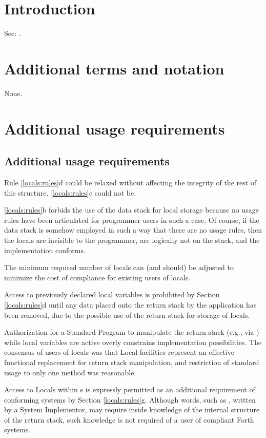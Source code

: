 \section{Introduction} %

See: .

\section{Additional terms and notation} %

None.

\section{Additional usage requirements} %

\begin{intro}
\subsection{Additional usage requirements} %

Rule \ref{locals:rules}d could be relaxed without affecting the
integrity of the rest of this structure. \ref{locals:rules}c could
not be.

\ref{locals:rules}b forbids the use of the data stack for local
storage because no usage rules have been articulated for programmer
users in such a case. Of course, if the data stack is somehow employed
in such a way that there are no usage rules, then the locals are
invisible to the programmer, are logically not on the stack, and the
implementation conforms.

The minimum required number of locals can (and should) be adjusted to
minimize the cost of compliance for existing users of locals.

Access to previously declared local variables is prohibited by Section
\ref{locals:rules}d until any data placed onto the return stack by the
application has been removed, due to the possible use of the return
stack for storage of locals.

Authorization for a Standard Program to manipulate the return stack
(e.g., via  ) while local variables are
active overly constrains implementation possibilities. The consensus
of users of locals was that Local facilities represent an effective
functional replacement for return stack manipulation, and restriction
of standard usage to only one method was reasonable.

Access to Locals within s is
expressly permitted as an additional requirement of conforming systems
by Section \ref{locals:rules}g. Although words, such as ,
written by a System Implementor, may require inside knowledge of the
internal structure of the return stack, such knowledge is not required
of a user of compliant Forth systems.
\end{intro}


